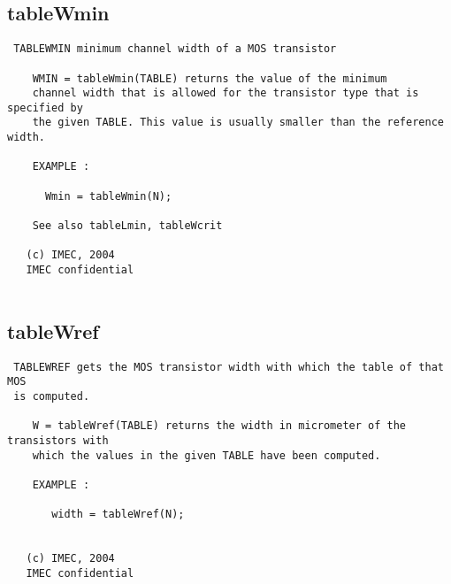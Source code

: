 \subsection{tableWmin}
\label{sec:tableWmin}
\begin{verbatim}
 TABLEWMIN minimum channel width of a MOS transistor
 
    WMIN = tableWmin(TABLE) returns the value of the minimum
    channel width that is allowed for the transistor type that is specified by
    the given TABLE. This value is usually smaller than the reference width.
 
    EXAMPLE :
 
      Wmin = tableWmin(N);
 
    See also tableLmin, tableWcrit
 
   (c) IMEC, 2004
   IMEC confidential 
 

\end{verbatim}

\newpage
\subsection{tableWref}
\label{sec:tableWref}
\begin{verbatim}
 TABLEWREF gets the MOS transistor width with which the table of that MOS 
 is computed.
 
    W = tableWref(TABLE) returns the width in micrometer of the transistors with
    which the values in the given TABLE have been computed.
 
    EXAMPLE :
 
       width = tableWref(N);
 
 
   (c) IMEC, 2004
   IMEC confidential 
 

\end{verbatim}

\newpage
\newpage
